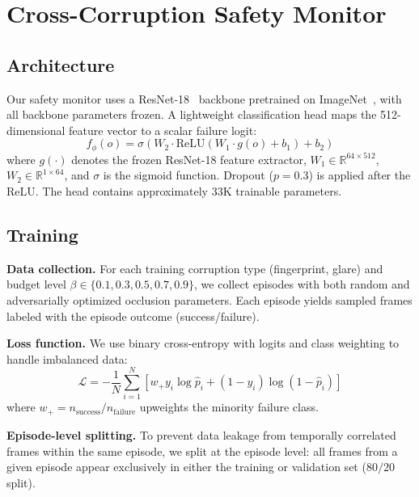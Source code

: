 \documentclass[letterpaper]{IEEEtran}
\begin{document}
\section{Cross-Corruption Safety Monitor}
\label{sec:safety_predictor}

\subsection{Architecture}

Our safety monitor uses a ResNet-18~\cite{resnet} backbone pretrained on ImageNet~\cite{imagenet}, with all backbone parameters frozen.
A lightweight classification head maps the 512-dimensional feature vector to a scalar failure logit:
\begin{equation}
    f_\phi(o) = \sigma\!\left(W_2 \cdot \text{ReLU}(W_1 \cdot g(o) + b_1) + b_2\right)
\end{equation}
where $g(\cdot)$ denotes the frozen ResNet-18 feature extractor, $W_1 \in \mathbb{R}^{64 \times 512}$, $W_2 \in \mathbb{R}^{1 \times 64}$, and $\sigma$ is the sigmoid function.
Dropout ($p = 0.3$) is applied after the ReLU.
The head contains approximately 33K trainable parameters.

\subsection{Training}

\noindent\textbf{Data collection.}
For each training corruption type (fingerprint, glare) and budget level $\beta \in \{0.1, 0.3, 0.5, 0.7, 0.9\}$, we collect episodes with both random and adversarially optimized occlusion parameters.
Each episode yields sampled frames labeled with the episode outcome (success/failure).

\noindent\textbf{Loss function.}
We use binary cross-entropy with logits and class weighting to handle imbalanced data:
\begin{equation}
    \mathcal{L} = -\frac{1}{N}\sum_{i=1}^{N} \left[w_+ y_i \log \hat{p}_i + (1 - y_i) \log (1 - \hat{p}_i)\right]
\end{equation}
where $w_+ = n_{\text{success}} / n_{\text{failure}}$ upweights the minority failure class.

\noindent\textbf{Episode-level splitting.}
To prevent data leakage from temporally correlated frames within the same episode, we split at the episode level: all frames from a given episode appear exclusively in either the training or validation set ($80/20$ split).
\end{document}
